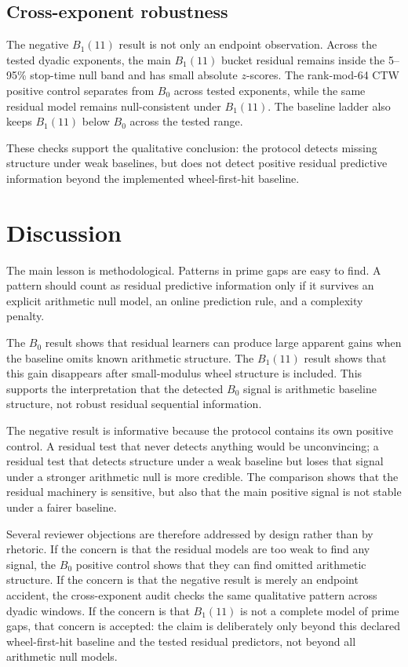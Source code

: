 \documentclass[11pt]{article}
\begin{document}
\subsection{Cross-exponent robustness}

The negative $B_1(11)$ result is not only an endpoint observation. Across the tested dyadic exponents, the main $B_1(11)$ bucket residual remains inside the 5--95\% stop-time null band and has small absolute $z$-scores. The rank-mod-64 CTW positive control separates from $B_0$ across tested exponents, while the same residual model remains null-consistent under $B_1(11)$. The baseline ladder also keeps $B_1(11)$ below $B_0$ across the tested range.

These checks support the qualitative conclusion: the protocol detects missing structure under weak baselines, but does not detect positive residual predictive information beyond the implemented wheel-first-hit baseline.

\section{Discussion}

The main lesson is methodological. Patterns in prime gaps are easy to find. A pattern should count as residual predictive information only if it survives an explicit arithmetic null model, an online prediction rule, and a complexity penalty.

The $B_0$ result shows that residual learners can produce large apparent gains when the baseline omits known arithmetic structure. The $B_1(11)$ result shows that this gain disappears after small-modulus wheel structure is included. This supports the interpretation that the detected $B_0$ signal is arithmetic baseline structure, not robust residual sequential information.

The negative result is informative because the protocol contains its own positive control. A residual test that never detects anything would be unconvincing; a residual test that detects structure under a weak baseline but loses that signal under a stronger arithmetic null is more credible. The comparison shows that the residual machinery is sensitive, but also that the main positive signal is not stable under a fairer baseline.

Several reviewer objections are therefore addressed by design rather than by rhetoric. If the concern is that the residual models are too weak to find any signal, the $B_0$ positive control shows that they can find omitted arithmetic structure. If the concern is that the negative result is merely an endpoint accident, the cross-exponent audit checks the same qualitative pattern across dyadic windows. If the concern is that $B_1(11)$ is not a complete model of prime gaps, that concern is accepted: the claim is deliberately only beyond this declared wheel-first-hit baseline and the tested residual predictors, not beyond all arithmetic null models.
\end{document}

